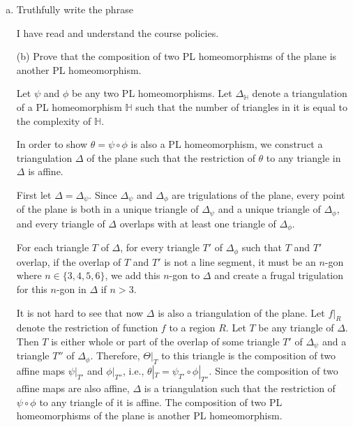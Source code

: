 \documentclass[11pt]{article}
\begin{document}
\begin{enumerate}[(a)]\itemsep0pt
  \item
    Truthfully write the phrase 

\begin{solution}
  I have read and understand the course policies.
\end{solution}

  \item[(b)]
    Prove that the composition of two PL homeomorphisms of the plane is another PL homeomorphism.

\begin{solution}
  Let \(\psi\) and \(\phi\) be any two PL homeomorphisms.
  Let \(\Delta_{\mathbb{H}}\) denote a triangulation of a PL homeomorphism \(\mathbb{H}\) such that the number of triangles in it is equal to the complexity of \(\mathbb{H}\).

  In order to show \(\theta=\psi\circ\phi\) is also a PL homeomorphism, we construct a triangulation \(\Delta\) of the plane such that the restriction of \(\theta\) to any triangle in \(\Delta\) is affine.

  First let \(\Delta=\Delta_{\psi}\).
  Since \(\Delta_{\psi}\) and \(\Delta_{\phi}\) are trigulations of the plane, every point of the plane is both in a unique triangle of \(\Delta_{\psi}\) and a unique triangle of \(\Delta_{\phi}\), and every triangle of \(\Delta\) overlaps with at least one triangle of \(\Delta_{\phi}\).

  For each triangle \(T\) of \(\Delta\), for every triangle \(T'\) of \(\Delta_{\phi}\) such that \(T\) and \(T'\) overlap, if the overlap of \(T\) and \(T'\) is not a line segment, it must be an \(n\)-gon where \(n\in\{3,4,5,6\}\), we add this \(n\)-gon to \(\Delta\) and create a frugal trigulation for this \(n\)-gon in \(\Delta\) if \(n>3\).

  It is not hard to see that now \(\Delta\) is also a triangulation of the plane. Let \(f|_{R}\) denote the restriction of function \(f\) to a region \(R\). Let \(T\) be any triangle of \(\Delta\).
  Then \(T\) is either whole or part of the overlap of some triangle \(T'\) of \(\Delta_{\psi}\) and a triangle \(T''\) of \(\Delta_{\phi}\).
  Therefore, \(\Theta|_{T}\) to this triangle is the composition of two affine maps \(\psi|_{T'}\) and \(\phi|_{T''}\), i.e., \(\theta|_{T}=\psi_{T'}\circ \phi|_{T''}\).
  Since the composition of two affine maps are also affine, \(\Delta\) is a triangulation such that the restriction of \(\psi\circ \phi\) to any triangle of it is affine.
  The composition of two PL homeomorphisms of the plane is another PL homeomorphism.


\end{solution}
\end{enumerate}
\end{document}
